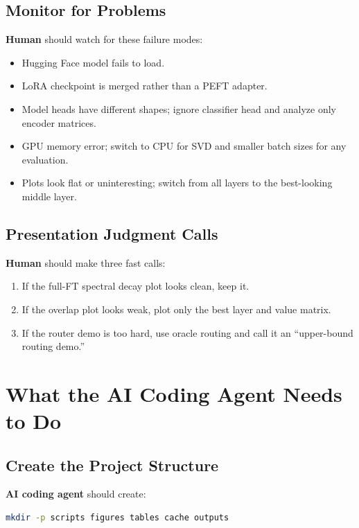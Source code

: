\documentclass[11pt]{article}
\newcommand{\human}{\textbf{Human}}
\newcommand{\agent}{\textbf{AI coding agent}}
\begin{document}
\subsection{Monitor for Problems}

\human{} should watch for these failure modes:

\begin{itemize}[leftmargin=*]
    \item Hugging Face model fails to load.
    \item LoRA checkpoint is merged rather than a PEFT adapter.
    \item Model heads have different shapes; ignore classifier head and analyze only encoder matrices.
    \item GPU memory error; switch to CPU for SVD and smaller batch sizes for any evaluation.
    \item Plots look flat or uninteresting; switch from all layers to the best-looking middle layer.
\end{itemize}

\subsection{Presentation Judgment Calls}

\human{} should make three fast calls:

\begin{enumerate}[leftmargin=*]
    \item If the full-FT spectral decay plot looks clean, keep it.
    \item If the overlap plot looks weak, plot only the best layer and value matrix.
    \item If the router demo is too hard, use oracle routing and call it an ``upper-bound routing demo.''
\end{enumerate}

\section{What the AI Coding Agent Needs to Do}

\subsection{Create the Project Structure}

\agent{} should create:

\begin{lstlisting}[language=bash]
mkdir -p scripts figures tables cache outputs
\end{lstlisting}
\end{document}
